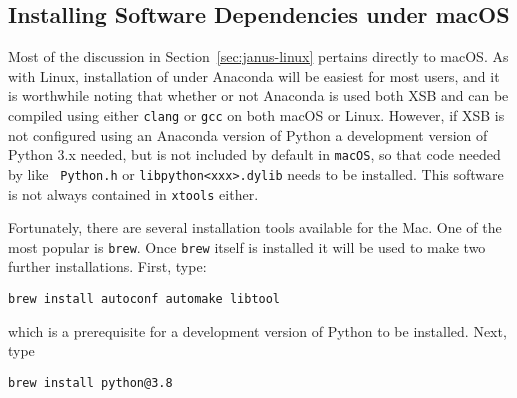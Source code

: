 
\noindent

\subsection{Installing Software Dependencies under  macOS}

Most of the discussion in Section~\ref{sec:janus-linux} pertains
directly to macOS.  As with Linux, installation of \janus{} under
Anaconda will be easiest for most users, and it is worthwhile noting
that whether or not Anaconda is used both XSB and \janus{} can be
compiled using either {\tt clang} or {\tt gcc} on both macOS or Linux.
%
%
However, if XSB is not configured using an Anaconda version of Python
a development version of Python 3.x needed, but is not included by
default in {\tt macOS}, so that code needed by \janusplg{} like {\tt
  Python.h} or {\tt libpython<xxx>.dylib} needs to be installed.  This
software is not always contained in {\tt xtools} either.

Fortunately, there are several installation tools available for the
Mac.  One of the most popular is {\tt brew}.  Once {\tt brew} itself
is installed it will be used to make two further installations.
First, type:

{\tt brew install autoconf automake libtool}

\noindent
which is a prerequisite for a development version of Python to be
installed.  Next, type 

{\tt brew install python@3.8}


